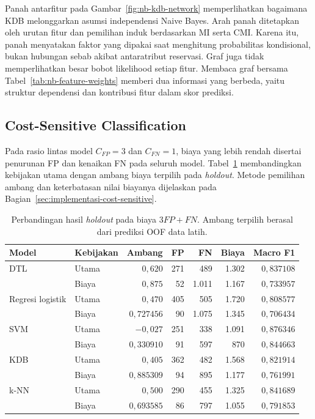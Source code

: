 Panah antarfitur pada Gambar~\ref{fig:nb-kdb-network} memperlihatkan
bagaimana KDB melonggarkan asumsi independensi Naive Bayes. Arah panah
ditetapkan oleh urutan fitur dan pemilihan induk berdasarkan MI serta
CMI. Karena itu, panah menyatakan faktor yang dipakai saat menghitung
probabilitas kondisional, bukan hubungan sebab akibat antaratribut
reservasi. Graf juga tidak memperlihatkan besar bobot likelihood setiap
fitur. Membaca graf bersama Tabel~\ref{tab:nb-feature-weights} memberi
dua informasi yang berbeda, yaitu struktur dependensi dan kontribusi
fitur dalam skor prediksi.

\subsection{Cost-Sensitive Classification}

Pada rasio lintas model $C_{FP}=3$ dan $C_{FN}=1$, biaya yang lebih rendah
disertai penurunan FP dan kenaikan FN pada seluruh model. Tabel~\ref{tab:cost-sensitive-models}
membandingkan kebijakan utama dengan ambang biaya terpilih pada
\textit{holdout}. Metode pemilihan ambang dan keterbatasan nilai biayanya
dijelaskan pada Bagian~\ref{sec:implementasi-cost-sensitive}.

\begin{table}[H]
    \centering
    \small
    \caption{Perbandingan hasil \textit{holdout} pada biaya $3FP+FN$. Ambang terpilih berasal dari prediksi OOF data latih.}
    \label{tab:cost-sensitive-models}
    \begin{tabular}{llrrrrr}
        \hline
        Model & Kebijakan & Ambang & FP & FN & Biaya & Macro F1 \\
        \hline
        DTL & Utama & $0{,}620$ & 271 & 489 & 1.302 & $0{,}837108$ \\
            & Biaya & $0{,}875$ & 52 & 1.011 & 1.167 & $0{,}733957$ \\
        Regresi logistik & Utama & $0{,}470$ & 405 & 505 & 1.720 & $0{,}808577$ \\
            & Biaya & $0{,}727456$ & 90 & 1.075 & 1.345 & $0{,}706434$ \\
        SVM & Utama & $-0{,}027$ & 251 & 338 & 1.091 & $0{,}876346$ \\
            & Biaya & $0{,}330910$ & 91 & 597 & 870 & $0{,}844663$ \\
        KDB & Utama & $0{,}405$ & 362 & 482 & 1.568 & $0{,}821914$ \\
            & Biaya & $0{,}885309$ & 94 & 895 & 1.177 & $0{,}761991$ \\
        k-NN & Utama & $0{,}500$ & 290 & 455 & 1.325 & $0{,}841689$ \\
            & Biaya & $0{,}693585$ & 86 & 797 & 1.055 & $0{,}791853$ \\
        \hline
    \end{tabular}
\end{table}

